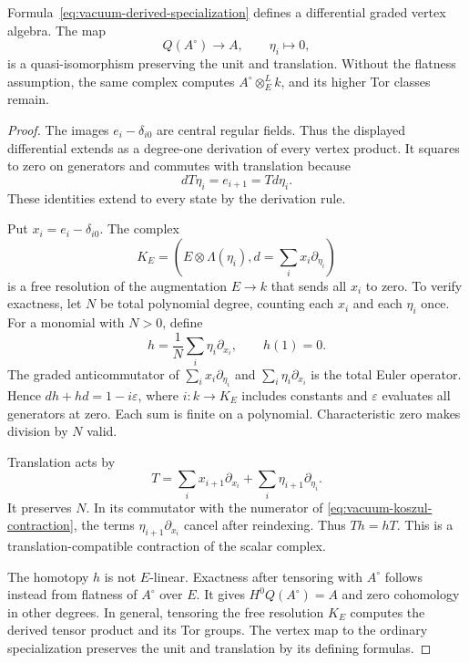 \begin{theorem}
\label{thm:vacuum-specialization}
Formula~\eqref{eq:vacuum-derived-specialization} defines a
differential graded vertex algebra.  The map
\[
 Q(A^\circ)\longrightarrow A,\qquad \eta_i\longmapsto0,
\]
is a quasi-isomorphism preserving the unit and translation.
Without the flatness assumption, the same complex computes
\(A^\circ\otimes_E^L k\), and its higher Tor classes remain.
\end{theorem}
\begin{proof}
The images \(e_i-\delta_{i0}\) are central regular fields.  Thus
the displayed differential extends as a degree-one derivation
of every vertex product.  It squares to zero on generators and
commutes with translation because
\[
 dT\eta_i=e_{i+1}=Td\eta_i.
\]
These identities extend to every state by the derivation rule.

Put \(x_i=e_i-\delta_{i0}\).  The complex
\[
 K_E=(E\otimes\Lambda(\eta_i),
           d=\textstyle\sum_i x_i\partial_{\eta_i})
\]
is a free resolution of the augmentation \(E\to k\) that sends
all \(x_i\) to zero.  To verify exactness, let \(N\) be total
polynomial degree, counting each \(x_i\) and each \(\eta_i\)
once.  For a monomial with \(N>0\), define
\begin{equation}
 h=\frac1N\sum_i\eta_i\partial_{x_i},\qquad h(1)=0.
 \label{eq:vacuum-koszul-contraction}
\end{equation}
The graded anticommutator of
\(\sum_i x_i\partial_{\eta_i}\) and
\(\sum_i\eta_i\partial_{x_i}\) is the total Euler operator.
Hence \(dh+hd=1-i\varepsilon\), where \(i:k\to K_E\) includes
constants and \(\varepsilon\) evaluates all generators at zero.
Each sum is finite on a polynomial.  Characteristic zero makes
division by \(N\) valid.

Translation acts by
\[
 T=\sum_i x_{i+1}\partial_{x_i}
       +\sum_i\eta_{i+1}\partial_{\eta_i}.
\]
It preserves \(N\).  In its commutator with the numerator of
\eqref{eq:vacuum-koszul-contraction}, the terms
\(\eta_{i+1}\partial_{x_i}\) cancel after reindexing.
Thus \(Th=hT\).  This is a translation-compatible contraction
of the scalar complex.

The homotopy \(h\) is not \(E\)-linear.  Exactness after tensoring
with \(A^\circ\) follows instead from flatness of \(A^\circ\)
over \(E\).  It gives
\(H^0Q(A^\circ)=A\) and zero cohomology in other degrees.
In general, tensoring the free resolution \(K_E\) computes the
derived tensor product and its Tor groups.  The vertex map to
the ordinary specialization preserves the unit and translation
by its defining formulas.
\end{proof}

